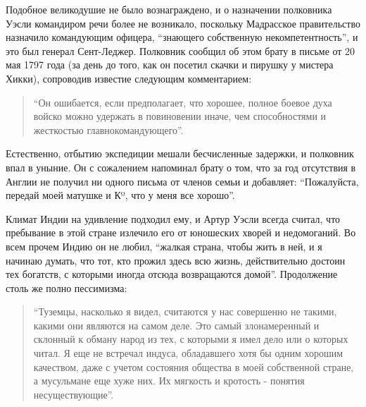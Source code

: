 \documentclass[
  oneside,
  12pt,
  titlepage]{book}
\begin{document}
Подобное великодушие не было вознаграждено, и о назначении полковника Уэсли командиром речи более не возникало, поскольку Мадрасское правительство назначило командующим офицера, ``знающего собственную некомпетентность'', и это был генерал Сент-Леджер. Полковник сообщил об этом брату в письме от 20 мая 1797 года (за день до того, как он посетил скачки и пирушку у мистера Хикки), сопроводив известие следующим комментарием:

\begin{quote}
``Он ошибается, если предполагает, что хорошее, полное боевое духа войско можно удержать в повиновении иначе, чем способностями и жесткостью главнокомандующего''.
\end{quote}

Естественно, отбытию экспедиции мешали бесчисленные задержки, и полковник впал в уныние. Он с сожалением напоминал брату о том, что за год отсутствия в Англии не получил ни одного письма от членов семьи и добавляет: ``Пожалуйста, передай моей матушке и Кº, что у меня все хорошо''.

Климат Индии на удивление подходил ему, и Артур Уэсли всегда считал, что пребывание в этой стране излечило его от юношеских хворей и недомоганий. Во всем прочем Индию он не любил, ``жалкая страна, чтобы жить в ней, и я начинаю думать, что тот, кто прожил здесь всю жизнь, действительно достоин тех богатств, с которыми иногда отсюда возвращаются домой''. Продолжение столь же полно пессимизма:

\begin{quote}
``Туземцы, насколько я видел, считаются у нас совершенно не такими, какими они являются на самом деле. Это самый злонамеренный и склонный к обману народ из тех, с которыми я имел дело или о которых читал. Я еще не встречал индуса, обладавшего хотя бы одним хорошим качеством, даже с учетом состояния общества в моей собственной стране, а мусульмане еще хуже них. Их мягкость и кротость - понятия несуществующие''.
\end{quote}
\end{document}
